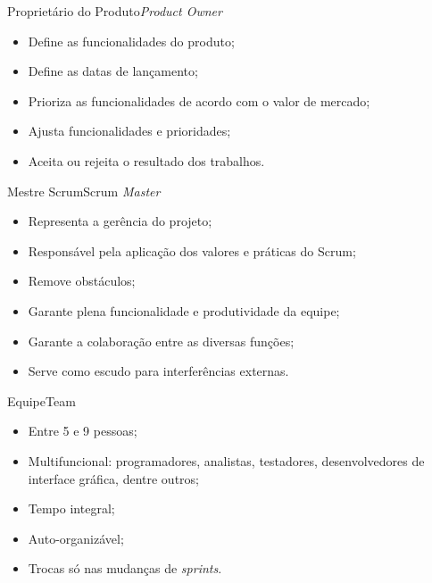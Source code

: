 \begin{frame}{Proprietário do Produto}{{\em Product Owner}}
  \begin{itemize}[<+-| alert@+>]
  \item Define as funcionalidades do produto;
  \item Define as datas de lançamento;
  \item Prioriza as funcionalidades de acordo com o valor de mercado;
  \item Ajusta funcionalidades e prioridades;
  \item Aceita ou rejeita o resultado dos trabalhos.
  \end{itemize}
\end{frame}

\begin{frame}{Mestre Scrum}{Scrum {\em Master}}
  \begin{itemize}[<+-| alert@+>]
  \item Representa a gerência do projeto;
  \item Responsável pela aplicação dos valores e práticas do Scrum;
  \item Remove obstáculos;
  \item Garante plena funcionalidade e produtividade da equipe;
  \item Garante a colaboração entre as diversas funções;
  \item Serve como escudo para interferências externas.
  \end{itemize}
\end{frame}

\begin{frame}{Equipe}{Team}
  \begin{itemize}[<+-| alert@+>]
  \item Entre 5 e 9 pessoas;
  \item Multifuncional: programadores, analistas, testadores, desenvolvedores de 
    interface gráfica, dentre outros;
  \item Tempo integral;
  \item Auto-organizável;
  \item Trocas só nas mudanças de {\em sprints}.
  \end{itemize}
\end{frame}

